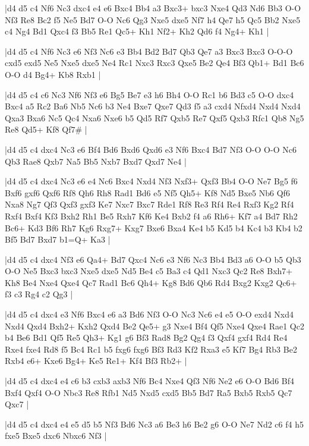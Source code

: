 \whitename{}
\blackname{}
\makegametitle
|d4 d5 c4 Nf6 Nc3 dxc4 e4 e6 Bxc4 Bb4 a3 Bxc3+ bxc3 Nxe4 Qd3 Nd6 Bb3 O-O Nf3 Re8 Bc2 f5 Ne5 Bd7 O-O Nc6 Qg3 Nxe5 dxe5 Nf7 h4 Qe7 h5 Qc5 Bb2 Nxe5 c4 Ng4 Bd1 Qxc4 f3 Bb5 Re1 Qc5+ Kh1 Nf2+ Kh2 Qd6 f4 Ng4+ Kh1  |

\whitename{}
\blackname{}
\makegametitle
|d4 d5 c4 Nf6 Nc3 e6 Nf3 Nc6 e3 Bb4 Bd2 Bd7 Qb3 Qe7 a3 Bxc3 Bxc3 O-O-O cxd5 exd5 Ne5 Nxe5 dxe5 Ne4 Rc1 Nxc3 Rxc3 Qxe5 Be2 Qe4 Bf3 Qb1+ Bd1 Bc6 O-O d4 Bg4+ Kb8 Rxb1  |

\whitename{}
\blackname{}
\makegametitle
|d4 d5 c4 c6 Nc3 Nf6 Nf3 e6 Bg5 Be7 e3 h6 Bh4 O-O Rc1 b6 Bd3 c5 O-O dxc4 Bxc4 a5 Rc2 Ba6 Nb5 Nc6 b3 Ne4 Bxe7 Qxe7 Qd3 f5 a3 cxd4 Nfxd4 Nxd4 Nxd4 Qxa3 Bxa6 Nc5 Qc4 Nxa6 Nxe6 b5 Qd5 Rf7 Qxb5 Re7 Qxf5 Qxb3 Rfc1 Qb8 Ng5 Re8 Qd5+ Kf8 Qf7\#  |

\whitename{}
\blackname{}
\makegametitle
|d4 d5 c4 dxc4 Nc3 e6 Bf4 Bd6 Bxd6 Qxd6 e3 Nf6 Bxc4 Bd7 Nf3 O-O O-O Nc6 Qb3 Rae8 Qxb7 Na5 Bb5 Nxb7 Bxd7 Qxd7 Ne4  |

\whitename{}
\blackname{}
\makegametitle
|d4 d5 c4 dxc4 Nc3 e6 e4 Nc6 Bxc4 Nxd4 Nf3 Nxf3+ Qxf3 Bb4 O-O Ne7 Bg5 f6 Bxf6 gxf6 Qxf6 Rf8 Qh6 Rh8 Rad1 Bd6 e5 Nf5 Qh5+ Kf8 Nd5 Bxe5 Nb6 Qf6 Nxa8 Ng7 Qf3 Qxf3 gxf3 Ke7 Nxc7 Bxc7 Rde1 Rf8 Re3 Rf4 Re4 Rxf3 Kg2 Rf4 Rxf4 Bxf4 Kf3 Bxh2 Rh1 Be5 Rxh7 Kf6 Ke4 Bxb2 f4 a6 Rh6+ Kf7 a4 Bd7 Rh2 Bc6+ Kd3 Bf6 Rh7 Kg6 Rxg7+ Kxg7 Bxe6 Bxa4 Ke4 b5 Kd5 b4 Kc4 b3 Kb4 b2 Bf5 Bd7 Bxd7 b1=Q+ Ka3  |

\whitename{}
\blackname{}
\makegametitle
|d4 d5 c4 dxc4 Nf3 e6 Qa4+ Bd7 Qxc4 Nc6 e3 Nf6 Nc3 Bb4 Bd3 a6 O-O b5 Qb3 O-O Ne5 Bxc3 bxc3 Nxe5 dxe5 Nd5 Be4 c5 Ba3 c4 Qd1 Nxc3 Qc2 Re8 Bxh7+ Kh8 Be4 Nxe4 Qxe4 Qc7 Rad1 Bc6 Qh4+ Kg8 Bd6 Qb6 Rd4 Bxg2 Kxg2 Qc6+ f3 c3 Rg4 c2 Qg3  |

\whitename{}
\blackname{}
\makegametitle
|d4 d5 c4 dxc4 e3 Nf6 Bxc4 e6 a3 Bd6 Nf3 O-O Nc3 Nc6 e4 e5 O-O exd4 Nxd4 Nxd4 Qxd4 Bxh2+ Kxh2 Qxd4 Be2 Qe5+ g3 Nxe4 Bf4 Qf5 Nxe4 Qxe4 Rae1 Qc2 b4 Be6 Bd1 Qf5 Re5 Qh3+ Kg1 g6 Bf3 Rad8 Bg2 Qg4 f3 Qxf4 gxf4 Rd4 Re4 Rxe4 fxe4 Rd8 f5 Bc4 Rc1 b5 fxg6 fxg6 Bf3 Rd3 Kf2 Rxa3 e5 Kf7 Bg4 Rb3 Be2 Rxb4 e6+ Kxe6 Bg4+ Ke5 Re1+ Kf4 Bf3 Rb2+  |

\whitename{}
\blackname{}
\makegametitle
|d4 d5 c4 dxc4 e4 c6 b3 cxb3 axb3 Nf6 Bc4 Nxe4 Qf3 Nf6 Ne2 e6 O-O Bd6 Bf4 Bxf4 Qxf4 O-O Nbc3 Re8 Rfb1 Nd5 Nxd5 cxd5 Bb5 Bd7 Ra5 Bxb5 Rxb5 Qc7 Qxc7  |

\whitename{}
\blackname{}
\makegametitle
|d4 d5 c4 dxc4 e4 e5 d5 b5 Nf3 Bd6 Nc3 a6 Be3 h6 Be2 g6 O-O Ne7 Nd2 c6 f4 h5 fxe5 Bxe5 dxc6 Nbxc6 Nf3  |

